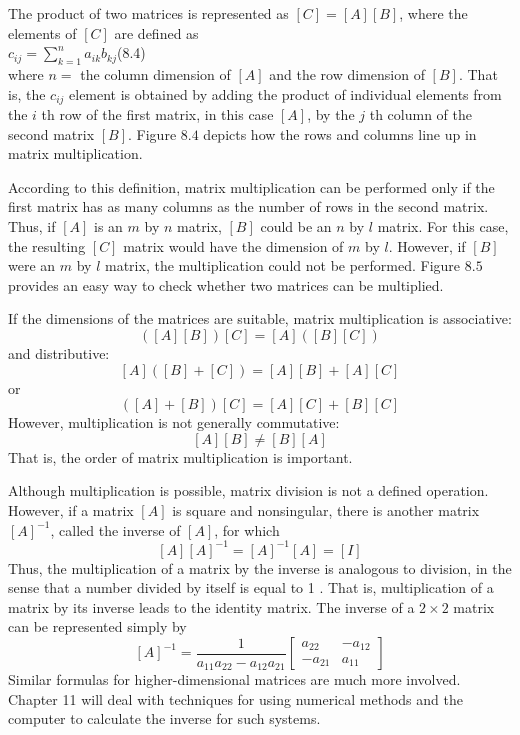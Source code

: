 \documentclass[../main.tex]{subfiles}
\begin{document}
The product of two matrices is represented as $[C]=[A][B]$, where the elements of $[C]$ are defined as
\\

$c_{i j}=\sum_{k=1}^{n} a_{i k} b_{k j}$\hfill{(8.4)}\\


\noindent where $n=$ the column dimension of $[A]$ and the row dimension of $[B]$. That is, the $c_{i j}$ element is obtained by adding the product of individual elements from the $i$ th row of the first matrix, in this case $[A]$, by the $j$ th column of the second matrix $[B]$. Figure $8.4$ depicts how the rows and columns line up in matrix multiplication.

According to this definition, matrix multiplication can be performed only if the first matrix has as many columns as the number of rows in the second matrix. Thus, if $[A]$ is an $m$ by $n$ matrix, $[B]$ could be an $n$ by $l$ matrix. For this case, the resulting $[C]$ matrix would have the dimension of $m$ by $l$. However, if $[B]$ were an $m$ by $l$ matrix, the multiplication could not be performed. Figure $8.5$ provides an easy way to check whether two matrices can be multiplied.

If the dimensions of the matrices are suitable, matrix multiplication is associative:
$$
([A][B])[C]=[A]([B][C])
$$
and distributive:
$$
[A]([B]+[C])=[A][B]+[A][C]
$$
or
$$
([A]+[B])[C]=[A][C]+[B][C]
$$
However, multiplication is not generally commutative:
$$
[A][B] \neq[B][A]
$$
That is, the order of matrix multiplication is important.

Although multiplication is possible, matrix division is not a defined operation. However, if a matrix $[A]$ is square and nonsingular, there is another matrix $[A]^{-1}$, called the inverse of $[A]$, for which
$$
[A][A]^{-1}=[A]^{-1}[A]=[I]
$$
Thus, the multiplication of a matrix by the inverse is analogous to division, in the sense that a number divided by itself is equal to 1 . That is, multiplication of a matrix by its inverse leads to the identity matrix.
The inverse of a $2 \times 2$ matrix can be represented simply by
$$
[A]^{-1}=\frac{1}{a_{11} a_{22}-a_{12} a_{21}}\left[\begin{array}{cc}
a_{22} & -a_{12} \\
-a_{21} & a_{11}
\end{array}\right]
$$
Similar formulas for higher-dimensional matrices are much more involved. Chapter 11 will deal with techniques for using numerical methods and the computer to calculate the inverse for such systems.
\end{document}
